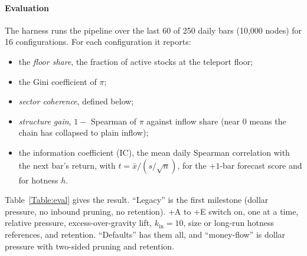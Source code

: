 \documentclass[preprint,3p,twocolumn]{elsarticle}
\begin{document}
\paragraph{Evaluation} The harness runs the pipeline over the last 60 of 250 daily bars (10,000 nodes) for 16 configurations. For each configuration it reports:
\begin{itemize}
\item the \emph{floor share}, the fraction of active stocks at the teleport floor;
\item the Gini coefficient of $\pi$;
\item \emph{sector coherence}, defined below;
\item \emph{structure gain}, $1-$ Spearman of $\pi$ against inflow share (near 0 means the chain has collapsed to plain inflow);
\item the information coefficient (IC), the mean daily Spearman correlation with the next bar's return, with $t=\bar{x}/(s/\sqrt{n})$, for the $+1$-bar forecast score and for hotness $h$.
\end{itemize}
Table~\ref{Table:eval} gives the result. ``Legacy'' is the first milestone (dollar pressure, no inbound pruning, no retention). +A to +E switch on, one at a time, relative pressure, excess-over-gravity lift, $k_{\mathrm{in}}=10$, size or long-run hotness references, and retention. ``Defaults'' has them all, and ``money-flow'' is dollar pressure with two-sided pruning and retention.
\end{document}
